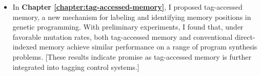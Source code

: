 \begin{itemize}
    \item In \textbf{Chapter \ref{chapter:tag-accessed-memory}}, I proposed tag-accessed memory, a new mechanism for labeling and identifying memory positions in genetic programming.  
    With preliminary experiments, I found that, under favorable mutation rates, both tag-accessed memory and conventional direct-indexed memory achieve similar performance on a range of program synthesis problems.
    [These results indicate promise as tag-accessed memory is further integrated into tagging control systems.]
\end{itemize}